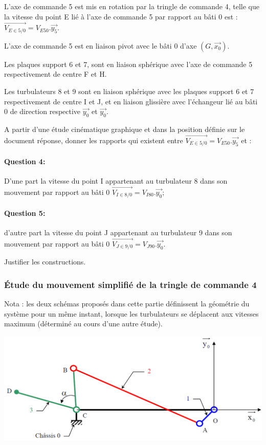 L'axe de commande 5 est mis en rotation par la tringle de commande 4, telle que la vitesse du point E lié à l'axe de commande 5 par rapport au bâti 0 est : $\overrightarrow{V_{E\in 5/0}}=V_{E50}.\overrightarrow{y_5}$.

L'axe de commande 5 est en liaison pivot avec le bâti 0 d'axe $(G,\overrightarrow{x_0})$.

Les plaques support 6 et 7, sont en liaison sphérique avec l'axe de commande 5 respectivement de centre F et H.

Les turbulateurs 8 et 9 sont en liaison sphérique avec les plaques support 6 et 7 respectivement de centre I et J, et en liaison glissière avec l'échangeur lié au bâti 0 de direction respective $\overrightarrow{y_0}$ et $\overrightarrow{y_0}$.

A partir d'une étude cinématique graphique et dans la position définie sur le document réponse, donner les rapports qui existent entre $\overrightarrow{V_{E\in 5/0}}=V_{E50}.\overrightarrow{y_5}$ et :

\paragraph{Question 4:}  D'une part la vitesse du point I appartenant au turbulateur 8 dans son mouvement par rapport au bâti 0 $\overrightarrow{V_{I\in 8/0}}=V_{I80}.\overrightarrow{y_0}$;

\paragraph{Question 5:} d'autre part la vitesse du point J appartenant au turbulateur 9 dans son mouvement par rapport au bâti 0 $\overrightarrow{V_{J\in 9/0}}=V_{J90}.\overrightarrow{y_0}$.

Justifier les constructions.

\subsubsection{Étude du mouvement simplifié de la tringle de commande 4}

Nota : les deux schémas proposés dans cette partie définissent la géométrie du système pour un même instant, lorsque les turbulateurs se déplacent aux vitesses maximum (déterminé au cours d'une autre étude).

\begin{center}
	\includegraphics[width=0.7\linewidth]{img/Chaudiere_cinematique_3}
\end{center}


